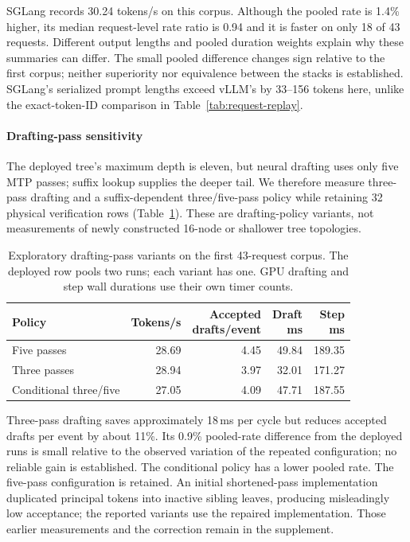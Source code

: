 SGLang records 30.24 tokens/s on this corpus. Although the pooled \sys{} rate is 1.4\% higher, its median request-level rate ratio is 0.94 and it is faster on only 18 of 43 requests. Different output lengths and pooled duration weights explain why these summaries can differ. The small pooled difference changes sign relative to the first corpus; neither superiority nor equivalence between the stacks is established. SGLang's serialized prompt lengths exceed vLLM's by 33--156 tokens here, unlike the exact-token-ID comparison in Table~\ref{tab:request-replay}.

\paragraph{Drafting-pass sensitivity}
The deployed tree's maximum depth is eleven, but neural drafting uses only five MTP passes; suffix lookup supplies the deeper tail. We therefore measure three-pass drafting and a suffix-dependent three/five-pass policy while retaining 32 physical verification rows (Table~\ref{tab:drafting-passes}). These are drafting-policy variants, not measurements of newly constructed 16-node or shallower tree topologies.

\begin{table}[t]
\caption{Exploratory drafting-pass variants on the first 43-request corpus. The deployed row pools two runs; each variant has one. GPU drafting and step wall durations use their own timer counts.}
\label{tab:drafting-passes}
\centering\small
\setlength{\tabcolsep}{3pt}
\begin{tabular}{@{}lrrrr@{}}
\toprule
Policy & Tokens/s & \shortstack{Accepted\\drafts/event} & \shortstack{Draft\\ms} & \shortstack{Step\\ms} \\
\midrule
Five passes & 28.69 & 4.45 & 49.84 & 189.35 \\
Three passes & 28.94 & 3.97 & 32.01 & 171.27 \\
Conditional three/five & 27.05 & 4.09 & 47.71 & 187.55 \\
\bottomrule
\end{tabular}
\end{table}

Three-pass drafting saves approximately 18\,ms per cycle but reduces accepted drafts per event by about 11\%. Its 0.9\% pooled-rate difference from the deployed runs is small relative to the observed variation of the repeated configuration; no reliable gain is established. The conditional policy has a lower pooled rate. The five-pass configuration is retained. An initial shortened-pass implementation duplicated principal tokens into inactive sibling leaves, producing misleadingly low acceptance; the reported variants use the repaired implementation. Those earlier measurements and the correction remain in the supplement.
